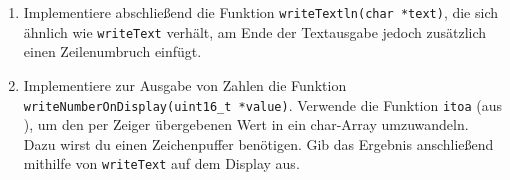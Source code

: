 \begin{enumerate}
\item 
Implementiere abschließend die Funktion \lstinline|writeTextln(char *text)|, die sich ähnlich wie \lstinline|writeText| verhält, am Ende der Textausgabe jedoch zusätzlich einen Zeilenumbruch einfügt.

\item 
Implementiere zur Ausgabe von Zahlen die Funktion \lstinline|writeNumberOnDisplay(uint16_t *value)|.
Verwende die Funktion \lstinline|itoa| (aus ), um den per Zeiger übergebenen Wert in ein char-Array umzuwandeln.
Dazu wirst du einen Zeichenpuffer benötigen.
Gib das Ergebnis anschließend mithilfe von \lstinline|writeText| auf dem Display aus.
\end{enumerate}

